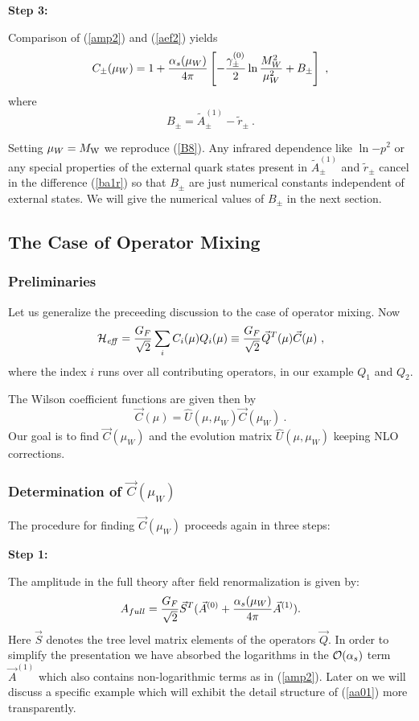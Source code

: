 \documentclass[12pt]{article}
\def\as{\alpha_s}
\newcommand{\mw}{M_{\rm W}}
\newcommand{\ord}{{\cal O}}
\begin{document}
\begin{itemize}
\begin{itemize}
\begin{itemize}
{\bf Step 3:}

Comparison of (\ref{amp2}) and (\ref{aef2}) yields 
\begin{equation}\label{cmw2}
 C_\pm(\mu_W)=1+{\as(\mu_W)\over 4\pi}\left[-{{\gamma^{(0)}_\pm}\over 2}
 \ln{M^2_W\over\mu^2_W}+B_\pm\right]~, \end{equation}
where
\begin{equation}\label{ba1r} B_\pm=\tilde A_\pm^{(1)}-\tilde r_\pm~.
 \end{equation}

Setting $\mu_W=\mw$ we reproduce (\ref{B8}).
Any infrared dependence like $\ln{-p^2}$ or any special properties
of the external quark states present in $\tilde A_\pm^{(1)}$ and 
$\tilde r_\pm$
cancel in the difference (\ref{ba1r}) so that $B_\pm$ are just  numerical 
constants independent of external states. We will give the numerical values of
$B_\pm$ in the next section.


\subsection{The Case of Operator Mixing}
\subsubsection{Preliminaries}
Let us generalize the preceeding discussion to the case of operator
mixing. Now
\begin{equation}\label{hqtc}
{\cal H}_{\it eff}={G_F\over\sqrt{2}}\sum_i C_i(\mu)Q_i(\mu)\equiv
  {G_F\over\sqrt{2}}\vec Q^T(\mu) \vec C(\mu)~,   \end{equation}
where the index $i$ runs over all contributing operators, in our
example $Q_1$ and $Q_2$. 

The Wilson coefficient functions are given then by
\begin{equation}\label{cucw}
\vec C(\mu)=\hat U(\mu, \mu_W)\vec C(\mu_W)~.
\end{equation}
Our goal is to find $\vec C(\mu_W)$ and the evolution matrix
$\hat U(\mu, \mu_W)$ keeping NLO corrections.   
\subsubsection{Determination of $\vec C(\mu_W)$}
The procedure for finding $\vec C(\mu_W)$ proceeds again in three
steps:

{\bf Step 1:}

The  amplitude in the full theory after
field renormalization is given by:
\begin{equation}\label{aa01} A_{full}=
{G_F\over\sqrt{2}}\vec S^T(\vec A^{(0)}
+{\as(\mu_W)\over 4\pi}\vec A^{(1)}).
\end{equation}
Here $\vec S$ denotes the tree level matrix elements of the
operators $\vec Q$. In order to simplify the presentation we
have absorbed the logarithms in the $\ord(\alpha_s)$ term
$\vec A^{(1)}$ which also contains non-logarithmic terms as in
(\ref{amp2}). Later on we will discuss a specific example which
will exhibit the detail structure of (\ref{aa01}) more transparently.


\end{itemize}
\end{itemize}
\end{itemize}
\end{document}

